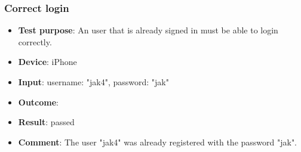 \documentclass[../ATD.tex]{subfiles}
\begin{document}
    \subsubsection{Correct login}\label{subsubsec:correct-login}
    \begin{itemize}
        \item \textbf{Test purpose}: An user that is already signed in must be able to login correctly.
        \item \textbf{Device}: iPhone
        \item \textbf{Input}: username: "jak4", password: "jak"
        \item \textbf{Outcome}:
        \item \textbf{Result}: passed
        \item \textbf{Comment}: The user "jak4" was already registered with the password "jak".
    \end{itemize}
\end{document}
